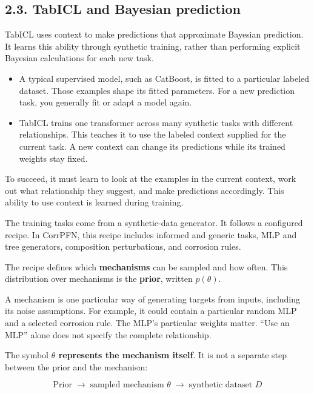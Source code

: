 \documentclass[11pt]{article}
\newenvironment{notes}
  {\begin{itemize}\setlength{\itemsep}{0.45em}\setlength{\parsep}{0pt}}
  {\end{itemize}}
\begin{document}
\subsection*{2.3. TabICL and Bayesian prediction}

TabICL uses context to make predictions that approximate Bayesian prediction. It learns
this ability through synthetic training, rather than performing explicit Bayesian
calculations for each new task.

\begin{notes}

    \item A typical supervised model, such as CatBoost, is fitted to a particular labeled
    dataset. Those examples shape its fitted parameters. For a new prediction task, you
    generally fit or adapt a model again.

    \item TabICL trains one transformer across many synthetic tasks with different
    relationships. This teaches it to use the labeled context supplied for the current
    task. A new context can change its predictions while its trained weights stay fixed.

\end{notes}

To succeed, it must learn to look at the examples in the current context, work out what
relationship they suggest, and make predictions accordingly. This ability to use context
is learned during training.

The training tasks come from a synthetic-data generator. It follows a configured recipe.
In CorrPFN, this recipe includes informed and generic tasks, MLP and tree generators,
composition perturbations, and corrosion rules.

The recipe defines which \textbf{mechanisms} can be sampled and how often. This
distribution over mechanisms is the \textbf{prior}, written \(p(\theta)\).

A mechanism is one particular way of generating targets from inputs, including its noise
assumptions. For example, it could contain a particular random MLP and a selected
corrosion rule. The MLP’s particular weights matter. “Use an MLP” alone does not specify
the complete relationship.

The symbol \textbf{\(\theta\) represents the mechanism itself}. It is not a separate step
between the prior and the mechanism:

\[
\boxed{
\text{Prior}
\;\longrightarrow\;
\text{sampled mechanism }\theta
\;\longrightarrow\;
\text{synthetic dataset }D
}
\]
\end{document}
